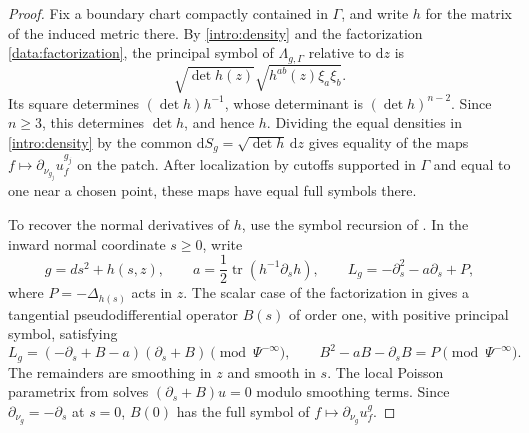 \documentclass[11pt,a4paper]{article}
\theoremstyle{definition}
\theoremstyle{remark}
\newcommand{\dd}{\mathrm d}
\DeclareMathOperator{\tr}{tr}
\numberwithin{equation}{section}
\begin{document}
\begin{proof}
Fix a boundary chart compactly contained in $\Gamma$, and write $h$
for the matrix of the induced metric there. By \eqref{intro:density}
and the factorization \eqref{data:factorization}, the principal symbol
of $\Lambda_{g,\Gamma}$ relative to $\dd z$ is
\[
 \sqrt{\det h(z)}\sqrt{h^{ab}(z)\xi_a\xi_b}.
\]
Its square determines $(\det h)h^{-1}$, whose determinant is
$(\det h)^{n-2}$. Since $n\ge3$, this determines $\det h$, and hence
$h$. Dividing the equal densities in \eqref{intro:density} by the
common $\dd S_g=\sqrt{\det h}\,\dd z$ gives equality of the maps
$f\mapsto\partial_{\nu_{g_j}}u_f^{g_j}$ on the patch. After localization
by cutoffs supported in $\Gamma$ and equal to one near a chosen point,
these maps have equal full symbols there.

To recover the normal derivatives of $h$, use the symbol recursion
of \citet{LeeUhlmann1989}. In the inward normal coordinate $s\ge0$,
write
\[
 g=ds^2+h(s,z),\qquad
 a=\frac12\tr(h^{-1}\partial_s h),\qquad
 L_g=-\partial_s^2-a\partial_s+P,
\]
where $P=-\Delta_{h(s)}$ acts in $z$. The scalar case of the
factorization in \citep[Proposition~3.1]{JoshiLionheart2005} gives
a tangential pseudodifferential operator $B(s)$ of order one, with
positive principal symbol, satisfying
\begin{equation}\label{data:factorization}
 L_g=(-\partial_s+B-a)(\partial_s+B)
          \pmod{\Psi^{-\infty}},\qquad
 B^2-aB-\partial_sB=P\pmod{\Psi^{-\infty}}.
\end{equation}
The remainders are smoothing in $z$ and smooth in $s$. The local
Poisson parametrix from \citep[Section~3]{JoshiLionheart2005} solves
$(\partial_s+B)u=0$ modulo smoothing terms. Since $\partial_{\nu_g}
=-\partial_s$ at $s=0$, $B(0)$ has the full symbol of
$f\mapsto\partial_{\nu_g}u_f^g$.


\end{proof}
\end{document}
